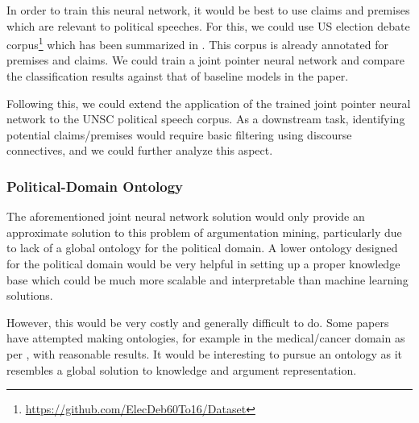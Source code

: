 \documentclass[12pt,a4paper]{article}
\begin{document}
In order to train this neural network, it would be best to use claims and
premises which are relevant to political speeches. For this, we could use US
election debate corpus\footnote{\url{https://github.com/ElecDeb60To16/Dataset}}
which has been summarized in \citet{haddadan-etal-2019-yes}. This corpus is
already annotated for premises and claims. We could train a joint pointer neural
network and compare the classification results against that of baseline models
in the paper.

Following this, we could extend the application of the trained joint pointer
neural network to the UNSC political speech corpus. As a downstream task,
identifying potential claims/premises would require basic filtering using
discourse connectives, and we could further analyze this aspect.

\subsubsection{Political-Domain Ontology}

The aforementioned joint neural network solution would only provide an
approximate solution to this problem of argumentation mining, particularly due
to lack of a global ontology for the political domain. A lower ontology designed
for the political domain would be very helpful in setting up a proper knowledge
base which could be much more scalable and interpretable than machine learning
solutions.

However, this would be very costly and generally difficult to do. Some papers
have attempted making ontologies, for example in the medical/cancer domain as
per \citet{ontology}, with reasonable results. It would be interesting to pursue
an ontology as it resembles a global solution to knowledge and argument
representation.

\newpage   \nocite{*}
\end{document}
